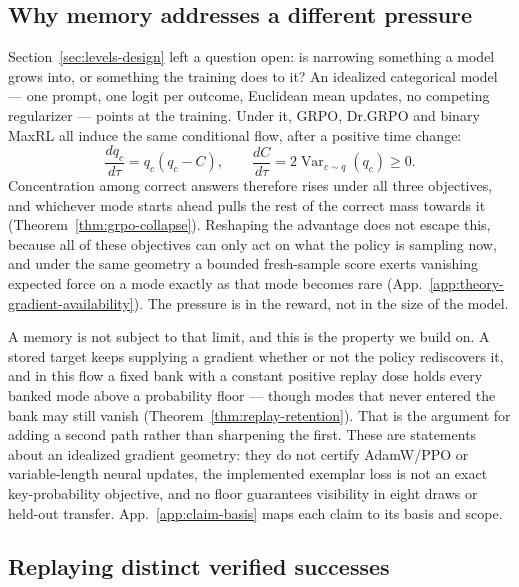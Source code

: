 \documentclass{article}
\newcommand{\1}{\mathbf 1}
\theoremstyle{remark}
\theoremstyle{definition}
\theoremstyle{plain}
\begin{document}
\subsection{Why memory addresses a different pressure}
\label{sec:collapse-mechanism}

Section~\ref{sec:levels-design} left a question open: is narrowing something a
model grows into, or something the training does to it? An idealized categorical
model --- one prompt, one logit per outcome, Euclidean mean updates, no
competing regularizer --- points at the training. Under it, GRPO, Dr.GRPO and
binary MaxRL all induce the same conditional flow, after a positive time change:
\begin{equation}
 \frac{dq_c}{d\tau}=q_c(q_c-C),\qquad
 \frac{dC}{d\tau}=2\operatorname{Var}_{c\sim q}(q_c)\ge0.
 \label{eq:main-collapse-flow}
\end{equation}
Concentration among correct answers therefore rises under all three objectives,
and whichever mode starts ahead pulls the rest of the correct mass towards it
(Theorem~\ref{thm:grpo-collapse}). Reshaping the advantage does not escape this,
because all of these objectives can only act on what the policy is sampling now,
and under the same geometry a bounded fresh-sample score exerts vanishing
expected force on a mode exactly as that mode becomes rare
(App.~\ref{app:theory-gradient-availability}). The pressure is in the reward,
not in the size of the model.

A memory is not subject to that limit, and this is the property we build on. A
stored target keeps supplying a gradient whether or not the policy rediscovers
it, and in this flow a fixed bank with a constant positive replay dose holds
every banked mode above a probability floor --- though modes that never entered
the bank may still vanish (Theorem~\ref{thm:replay-retention}). That is the
argument for adding a second path rather than sharpening the first. These are
statements about an idealized gradient geometry: they do not certify AdamW/PPO
or variable-length neural updates, the implemented exemplar loss is not an exact
key-probability objective, and no floor guarantees visibility in eight draws or
held-out transfer. App.~\ref{app:claim-basis} maps each claim to its basis and
scope.

\subsection{Replaying distinct verified successes}
\label{sec:replay}
\end{document}
